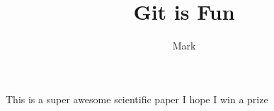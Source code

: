 \documentclass[10pt,a4paper]{article}
\author{Mark}
\title{Git is Fun}
\begin{document}
	\maketitle
	This is a super awesome scientific paper \newline
	I hope I win a prize
\end{document}
